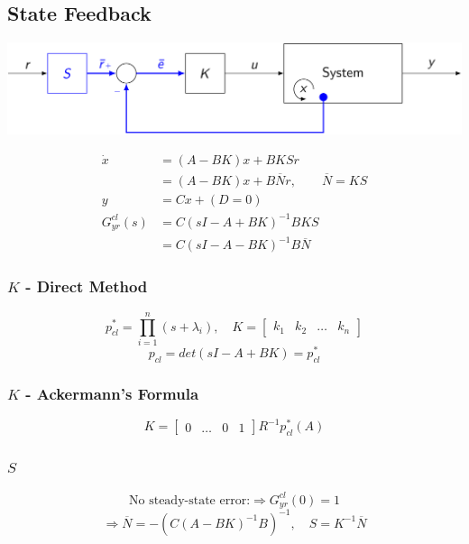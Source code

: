 \subsection{State Feedback}
\centerline{\includegraphics[width=0.95\linewidth]{src/3_state_feedback/images/state_feedback.jpeg}}
\begin{align*}
    \dot{x} &= (A-BK)x + BKSr\\
    &= (A-BK)x + B\overline{N}r, \qquad \overline{N} = KS\\
    y &= Cx + (D=0)\\[5pt]
    G_{yr}^{cl}(s) &= C(sI - A + BK)^{-1}BKS\\
    &= C(sI - A - BK)^{-1}B\overline{N}
\end{align*}

\subsubsection{$K$ - Direct Method}
$$
    p_{cl}^* = \prod_{i=1}^{n}(s + \lambda_i), \quad K = \begin{bmatrix} k_1 & k_2 & \hdots & k_n \end{bmatrix}
$$
$$
    p_{cl} = det(sI - A + BK) = p_{cl}^*
$$

\subsubsection{$K$ - Ackermann's Formula}
$$
    K = \begin{bmatrix} 0 & \hdots & 0 & 1 \end{bmatrix} R^{-1}p_{cl}^*(A)
$$
\vspace*{0.1em}

\subsubsection{$S$}
$$
    \text{No steady-state error:} \Rightarrow G_{yr}^{cl}(0) = 1
$$
$$
    \Longrightarrow \overline{N} = - (C(A-BK)^{-1}B)^{-1}, \quad S = K^{-1}\overline{N}
$$
\vspace*{0.1em}